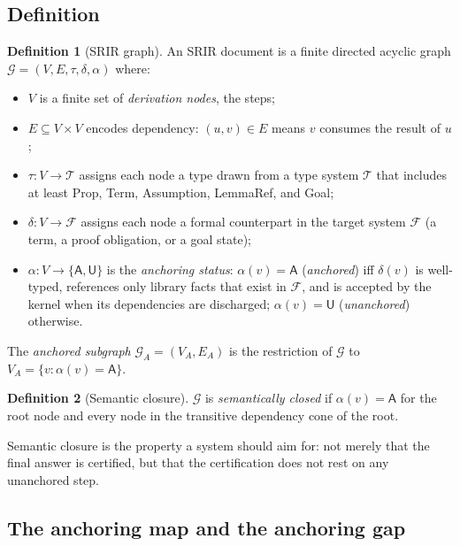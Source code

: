 \documentclass[11pt,a4paper]{article}
\theoremstyle{definition}
\newtheorem{definition}{Definition}[section]
\theoremstyle{plain}
\theoremstyle{remark}
\newcommand{\FS}{\mathcal{F}}          %
\begin{document}
\subsection{Definition}

\begin{definition}[SRIR graph]
\label{def:srir}
An SRIR document is a finite directed acyclic graph
$\mathcal{G} = (V, E, \tau, \delta, \alpha)$ where:
\begin{itemize}
  \item $V$ is a finite set of \emph{derivation nodes}, the steps;
  \item $E \subseteq V \times V$ encodes dependency: $(u,v) \in E$ means $v$
        consumes the result of $u$;
  \item $\tau : V \to \mathcal{T}$ assigns each node a type drawn from a type
        system $\mathcal{T}$ that includes at least \textsf{Prop},
        \textsf{Term}, \textsf{Assumption}, \textsf{LemmaRef}, and
        \textsf{Goal};
  \item $\delta : V \to \FS$ assigns each node a formal counterpart in the
        target system $\FS$ (a term, a proof obligation, or a goal state);
  \item $\alpha : V \to \{\mathsf{A}, \mathsf{U}\}$ is the \emph{anchoring
        status}: $\alpha(v) = \mathsf{A}$ (\emph{anchored}) iff $\delta(v)$ is
        well-typed, references only library facts that exist in $\FS$, and is
        accepted by the kernel when its dependencies are discharged;
        $\alpha(v) = \mathsf{U}$ (\emph{unanchored}) otherwise.
\end{itemize}
\end{definition}

The \emph{anchored subgraph} $\mathcal{G}_A = (V_A, E_A)$ is the restriction of
$\mathcal{G}$ to $V_A = \{v : \alpha(v) = \mathsf{A}\}$.

\begin{definition}[Semantic closure]
\label{def:closure}
$\mathcal{G}$ is \emph{semantically closed} if $\alpha(v) = \mathsf{A}$ for the
root node and every node in the transitive dependency cone of the root.
\end{definition}

Semantic closure is the property a system should aim for: not merely that the
final answer is certified, but that the certification does not rest on any
unanchored step.

\subsection{The anchoring map and the anchoring gap}
\end{document}
